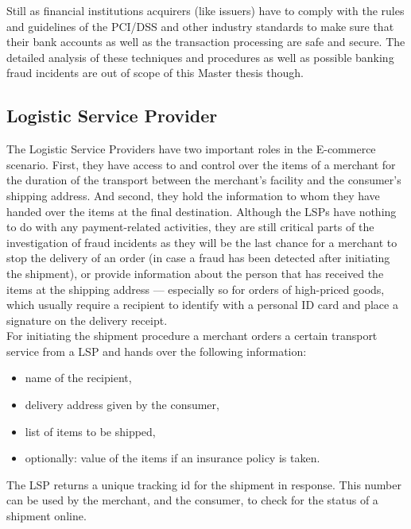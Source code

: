 Still as financial institutions acquirers (like issuers) have to comply with the rules and guidelines of the \gls{PCI/DSS} and other industry standards to make sure that their bank accounts as well as the transaction processing are safe and secure. The detailed analysis of these techniques and procedures as well as possible banking fraud incidents are out of scope of this Master thesis though.


\subsection{Logistic Service Provider}
\label{subsec:stakeholder_lsp}

The Logistic Service Providers have two important roles in the \gls{E-commerce} scenario. First, they have access to and control over the items of a merchant for the duration of the transport between the merchant's facility and the consumer's shipping address. And second, they hold the information to whom they have handed over the items at the final destination. Although the \gls{LSP}s have nothing to do with any payment-related activities, they are still critical parts of the investigation of fraud incidents as they will be the last chance for a merchant to stop the delivery of an order (in case a fraud has been detected after initiating the shipment), or provide information about the person that has received the items at the shipping address --- especially so for orders of high-priced goods, which usually require a recipient to identify with a personal ID card and place a signature on the delivery receipt. \\

For initiating the shipment procedure a merchant orders a certain transport service from a \gls{LSP} and hands over the following information:\@

\begin{itemize}
	\item name of the recipient,
	\item delivery address given by the consumer,
	\item list of items to be shipped,
	\item optionally: value of the items if an insurance policy is taken.
\end{itemize}

The \gls{LSP} returns a unique tracking id for the shipment in response. This number can be used by the merchant, and the consumer, to check for the status of a shipment online. \\

